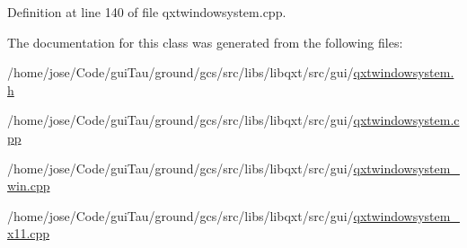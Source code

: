 Definition at line 140 of file qxtwindowsystem.\-cpp.



The documentation for this class was generated from the following files\-:\begin{DoxyCompactItemize}
\item 
/home/jose/\-Code/gui\-Tau/ground/gcs/src/libs/libqxt/src/gui/\hyperlink{qxtwindowsystem_8h}{qxtwindowsystem.\-h}\item 
/home/jose/\-Code/gui\-Tau/ground/gcs/src/libs/libqxt/src/gui/\hyperlink{qxtwindowsystem_8cpp}{qxtwindowsystem.\-cpp}\item 
/home/jose/\-Code/gui\-Tau/ground/gcs/src/libs/libqxt/src/gui/\hyperlink{qxtwindowsystem__win_8cpp}{qxtwindowsystem\-\_\-win.\-cpp}\item 
/home/jose/\-Code/gui\-Tau/ground/gcs/src/libs/libqxt/src/gui/\hyperlink{qxtwindowsystem__x11_8cpp}{qxtwindowsystem\-\_\-x11.\-cpp}\end{DoxyCompactItemize}
